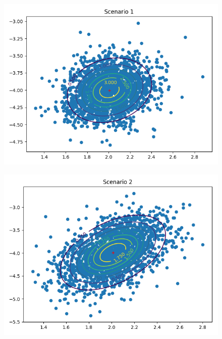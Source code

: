 \documentclass[a4paper]{article}
\begin{document}
\begin{itemize}
\begin{itemize}
\begin{figure}[htp]
\centering
\begin{minipage}{0.4\textwidth}
  \includegraphics[scale=0.38]{plots/plot_gauss_contour_scenario_1.png}
  \label{fig:16}
\end{minipage}
\hfill
\begin{minipage}{0.4\textwidth}
  \includegraphics[scale=0.38]{plots/plot_gauss_contour_scenario_2.png}
  \label{fig:17}
\end{minipage}
\end{figure}
\hfill
\begin{figure}[htp]

\end{figure}
\end{itemize}
\end{itemize}
\end{document}
